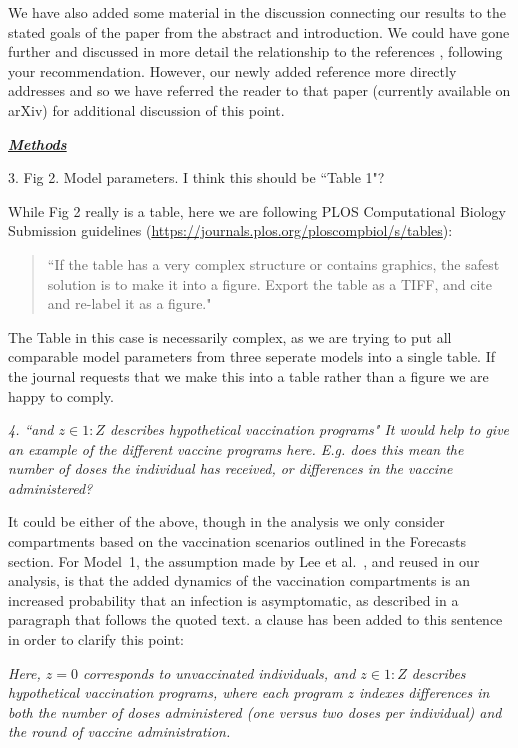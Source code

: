 \documentclass[11pt]{article}
\newcommand\seq[2]{{#1}\!:\!{#2}}
\newcommand\vaccClass{Z}
\newcommand\vaccCounter{z}
\newcommand\report[1]{{\color{mygreen} \vspace{1mm}\hspace{0.25in}\parbox{6in}{\em #1}}}
\newcommand\article[1]{{\color{blue} \vspace{1mm}\hspace{0.25in}\parbox{6in}{\em #1}}}
\begin{document}
\article{\editModelingGuidanceFirst}

\article{\indent\editModelingGuidanceSecond}

We have also added some material in the discussion connecting our results to the stated goals of the paper from the abstract and introduction.
We could have gone further and discussed in more detail the relationship to the references \cite{behrend20,saltelli20}, following your recommendation.
However, our newly added reference \cite{li23} more directly addresses \cite{behrend20,saltelli20} and so we have referred the reader to that paper (currently available on arXiv) for additional discussion of this point.

\report{
  \textbf{\underline{Methods}}

3.  Fig 2. Model parameters. I think this should be ``Table 1"?
}

While Fig 2 really is a table, here we are following PLOS Computational Biology Submission guidelines (\url{https://journals.plos.org/ploscompbiol/s/tables}):
\begin{quote}
``If the table has a very complex structure or contains graphics, the safest solution is to make it into a figure. Export the table as a TIFF, and cite and re-label it as a figure."
\end{quote}
The Table in this case is necessarily complex, as we are trying to put all comparable model parameters from three seperate models into a single table.
If the journal requests that we make this into a table rather than a figure we are happy to comply.

\report{4.
    ``and $z \in 1:Z$ describes hypothetical vaccination programs" It would help to give an example of the different vaccine programs here. E.g. does this mean the number of doses the individual has received, or differences in the vaccine administered?
}

It could be either of the above, though in the analysis we only consider compartments based on the vaccination scenarios outlined in the Forecasts section. 
For Model~1, the assumption made by Lee et al.~\cite{lee20}, and reused in our analysis, is that the added dynamics of the vaccination compartments is an increased probability that an infection is asymptomatic, as described in a paragraph that follows the quoted text. 
a clause has been added to this sentence in order to clarify this point: 

\article{Here, $\vaccCounter=0$ corresponds to unvaccinated individuals, and $\vaccCounter \in \seq{1}{\vaccClass}$ describes hypothetical vaccination programs, where each program $\vaccCounter$ indexes differences in both the number of doses administered (one versus two doses per individual) and the round of vaccine administration.}
\end{document}
